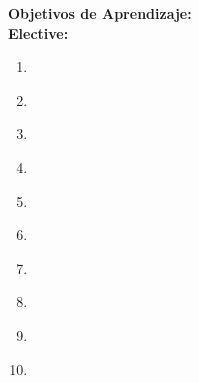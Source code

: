 \noindent \textbf{Objetivos de Aprendizaje:}\\
\noindent \textbf{Elective:}
\begin{enumerate}
	\setcounter{enumi}{0}
	\item \ISPerceptionandComputerVisionLOSummarizeTheImage\xspace[\ISPerceptionandComputerVisionLOSummarizeTheImageLevel]\label{sec:BOK:ISPerceptionandComputerVisionLOSummarizeTheImage}
	\item \ISPerceptionandComputerVisionLOListAt\xspace[\ISPerceptionandComputerVisionLOListAtLevel]\label{sec:BOK:ISPerceptionandComputerVisionLOListAt}
	\item \ISPerceptionandComputerVisionLOImplementD\xspace[\ISPerceptionandComputerVisionLOImplementDLevel]\label{sec:BOK:ISPerceptionandComputerVisionLOImplementD}
	\item \ISPerceptionandComputerVisionLODistinguishThe\xspace[\ISPerceptionandComputerVisionLODistinguishTheLevel]\label{sec:BOK:ISPerceptionandComputerVisionLODistinguishThe}
	\item \ISPerceptionandComputerVisionLOProvideAt\xspace[\ISPerceptionandComputerVisionLOProvideAtLevel]\label{sec:BOK:ISPerceptionandComputerVisionLOProvideAt}
	\item \ISPerceptionandComputerVisionLOImplementAAlgorithm\xspace[\ISPerceptionandComputerVisionLOImplementAAlgorithmLevel]\label{sec:BOK:ISPerceptionandComputerVisionLOImplementAAlgorithm}
	\item \ISPerceptionandComputerVisionLOImplementAn\xspace[\ISPerceptionandComputerVisionLOImplementAnLevel]\label{sec:BOK:ISPerceptionandComputerVisionLOImplementAn}
	\item \ISPerceptionandComputerVisionLOImplementAThat\xspace[\ISPerceptionandComputerVisionLOImplementAThatLevel]\label{sec:BOK:ISPerceptionandComputerVisionLOImplementAThat}
	\item \ISPerceptionandComputerVisionLOEvaluateTheThe\xspace[\ISPerceptionandComputerVisionLOEvaluateTheTheLevel]\label{sec:BOK:ISPerceptionandComputerVisionLOEvaluateTheThe}
	\item \ISPerceptionandComputerVisionLODescribeAtClassification\xspace[\ISPerceptionandComputerVisionLODescribeAtClassificationLevel]\label{sec:BOK:ISPerceptionandComputerVisionLODescribeAtClassification}
\end{enumerate}




\section{\NC}\label{sec:BOK:NC}
\NCBOKDescription

